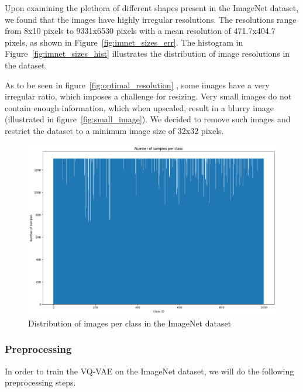 Upon examining the plethora of different shapes present in the ImageNet dataset, we found that the images have highly
irregular resolutions.
The resolutions range from 8x10 pixels to 9331x6530 pixels with a mean resolution of 471.7x404.7 pixels, as shown in
Figure~\ref{fig:imnet_sizes_err}.
The histogram in Figure~\ref{fig:imnet_sizes_hist} illustrates the distribution of image resolutions in the dataset.

As to be seen in figure~\ref{fig:optimal_resolution}
, some images have a very irregular ratio, which imposes a challenge for resizing.
Very small images do not contain enough information, which when upscaled, result in a blurry image (illustrated in
figure~\ref{fig:small_image}).
We decided to remove such images and restrict the dataset to a minimum image size of 32x32 pixels.

\begin{figure}
    \centering
    \includegraphics[width=\textwidth]{../../sample_images/imagenet_dist}
    \caption{Distribution of images per class in the ImageNet dataset}
    \label{fig:imnet_dist}
\end{figure}

\subsubsection{Preprocessing}
In order to train the VQ-VAE on the ImageNet dataset, we will do the following preprocessing steps.


